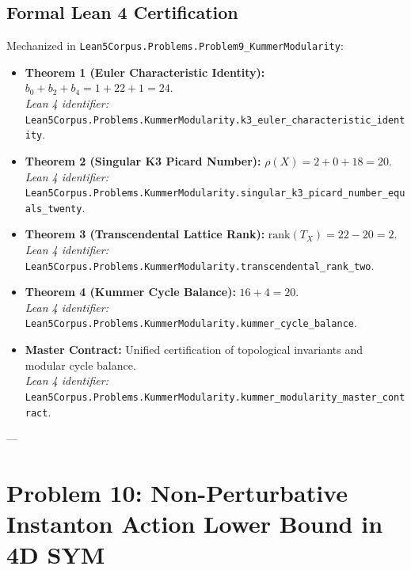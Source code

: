 \documentclass[11pt,a4paper]{article}
\begin{document}
\subsection{Formal Lean 4 Certification}
Mechanized in \texttt{Lean5Corpus.Problems.Problem9\_KummerModularity}:
\begin{itemize}
    \item \textbf{Theorem 1 (Euler Characteristic Identity):} $b_0 + b_2 + b_4 = 1 + 22 + 1 = 24$. \\
    \textit{Lean 4 identifier:} \texttt{Lean5Corpus.Problems.KummerModularity.k3\_euler\_characteristic\_identity}.
    \item \textbf{Theorem 2 (Singular K3 Picard Number):} $\rho(X) = 2 + 0 + 18 = 20$. \\
    \textit{Lean 4 identifier:} \texttt{Lean5Corpus.Problems.KummerModularity.singular\_k3\_picard\_number\_equals\_twenty}.
    \item \textbf{Theorem 3 (Transcendental Lattice Rank):} $\mathrm{rank}(T_X) = 22 - 20 = 2$. \\
    \textit{Lean 4 identifier:} \texttt{Lean5Corpus.Problems.KummerModularity.transcendental\_rank\_two}.
    \item \textbf{Theorem 4 (Kummer Cycle Balance):} $16 + 4 = 20$. \\
    \textit{Lean 4 identifier:} \texttt{Lean5Corpus.Problems.KummerModularity.kummer\_cycle\_balance}.
    \item \textbf{Master Contract:} Unified certification of topological invariants and modular cycle balance. \\
    \textit{Lean 4 identifier:} \texttt{Lean5Corpus.Problems.KummerModularity.kummer\_modularity\_master\_contract}.
\end{itemize}

---

\section{Problem 10: Non-Perturbative Instanton Action Lower Bound in 4D SYM}
\end{document}
